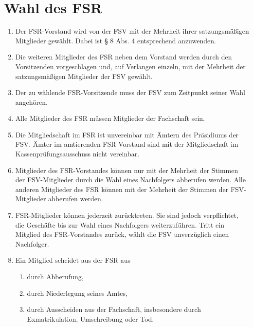 \documentclass{article}
\begin{document}
\section{Wahl des FSR}    
\begin{enumerate}[(1)]
    \item Der FSR-Vorstand wird von der FSV mit der Mehrheit ihrer satzungsmäßigen Mitglieder gewählt. Dabei ist § 8 Abs. 4 entsprechend anzuwenden.
    \item Die weiteren Mitglieder des FSR neben dem Vorstand werden durch den Vorsitzenden vorgeschlagen und, auf Verlangen einzeln, mit der Mehrheit der satzungsmäßigen Mitglieder der FSV gewählt.
    \item Der zu wählende FSR-Vorsitzende muss der FSV zum Zeitpunkt seiner Wahl angehören.
    \item Alle Mitglieder des FSR müssen Mitglieder der Fachschaft sein.
    \item Die Mitgliedschaft im FSR ist unvereinbar mit Ämtern des Präsidiums der FSV. Ämter im amtierenden FSR-Vorstand sind mit der Mitgliedschaft im Kassenprüfungsausschuss nicht vereinbar.
    \item Mitglieder des FSR-Vorstandes können nur mit der Mehrheit der Stimmen der FSV-Mitglieder durch die Wahl eines Nachfolgers abberufen werden. Alle anderen Mitglieder des FSR können mit der Mehrheit der Stimmen der FSV-Mitglieder abberufen werden.
    \item FSR-Mitglieder können jederzeit zurücktreten. Sie sind jedoch verpflichtet, die Geschäfte bis zur Wahl eines Nachfolgers weiterzuführen. Tritt ein Mitglied des FSR-Vorstandes zurück, wählt die FSV unverzüglich einen Nachfolger.
    \item Ein Mitglied scheidet aus der FSR aus
    \begin{enumerate}[1.]
    	\item durch Abberufung,
	    \item durch Niederlegung seines Amtes,
        \item durch Ausscheiden aus der Fachschaft, insbesondere durch Exmatrikulation, Umschreibung oder Tod.
	\end{enumerate} 
\end{enumerate}
\end{document}
